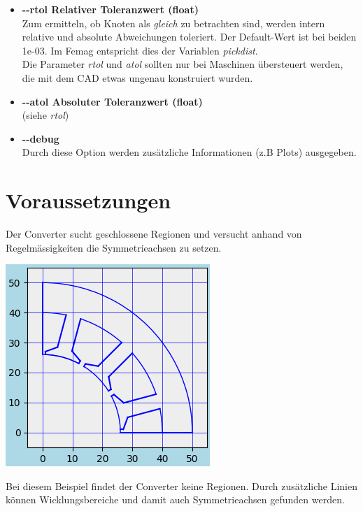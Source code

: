 \documentclass[10pt, a4paper,german]{scrartcl}
\newcommand{\Slanted}[1]{{\normalfont\slshape #1}}
\newcommand{\LongArg}[1]{\mbox{{-}{-}#1}}
\begin{document}
\begin{itemize}
\item {\bfseries{\LongArg{rtol} Relativer Toleranzwert (float)}}\\
		Zum ermitteln, ob Knoten als \Slanted{gleich} zu betrachten sind, werden intern relative
		und absolute Abweichungen toleriert. Der Default-Wert ist bei beiden 1e-03. Im Femag
		entspricht dies der Variablen \Slanted{pickdist}.\\
		Die Parameter \Slanted{rtol} und \Slanted{atol} sollten nur bei Maschinen übersteuert 
		werden, die mit dem CAD etwas ungenau konstruiert wurden.
		
\item {\bfseries{\LongArg{atol} Absoluter Toleranzwert (float)}}\\
		(siehe \Slanted{rtol})
		
\item {\bfseries{\LongArg{debug}}}\\
		Durch diese Option werden zusätzliche Informationen (z.B Plots) ausgegeben.
\end{itemize}

\section{Voraussetzungen}
Der Converter sucht geschlossene Regionen und versucht anhand von Regelmässigkeiten die
Symmetrieachsen zu setzen.
\begin{center}
\includegraphics[width=0.45\linewidth]{BspStator}
\end{center}
Bei diesem Beispiel findet der Converter keine Regionen.
Durch zusätzliche Linien können Wicklungsbereiche und damit auch Symmetrieachsen
gefunden werden.
\end{document}
